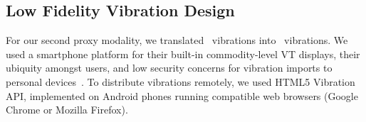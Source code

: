         

   

\subsection{Low Fidelity Vibration Design} 
For our second proxy modality, we translated \hifi~vibrations into \lofi~vibrations.
We used a smartphone platform for their built-in commodity-level VT displays, their ubiquity amongst users, and low security concerns for vibration imports to personal devices~\cite{Felt2012}.
To distribute vibrations remotely, we used HTML5 Vibration API, implemented on Android phones running compatible web browsers (Google Chrome or Mozilla Firefox).

